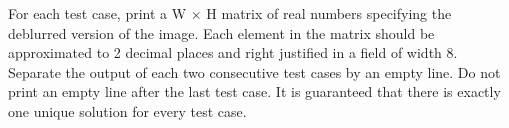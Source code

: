 For each test case, print a W × H matrix of real numbers specifying the deblurred version of the image. Each element in the matrix should be approximated to 2 decimal places and right justified in a field of width 8. Separate the output of each two consecutive test cases by an empty line. Do not print an empty line after the last test case. It is guaranteed that there is exactly one unique solution for every test case.